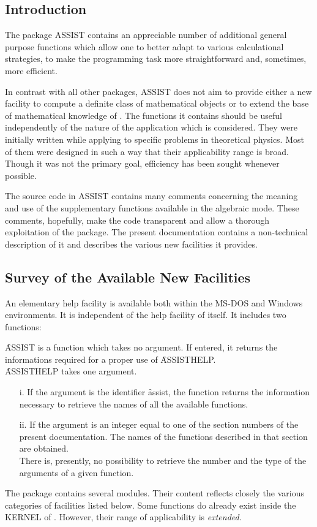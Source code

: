\subsection{Introduction}
The package ASSIST contains
an appreciable number of additional general purpose functions which allow
one to better adapt \REDUCE to various calculational strategies,
to make the programming task more straightforward and, sometimes, 
more efficient.

In contrast with all other packages, ASSIST does not aim to provide either a
new facility to compute a definite class of mathematical objects or to extend
the base of mathematical knowledge of \REDUCE.
The functions it contains should be
useful independently of the nature of the application which is considered.
They were initially written while applying \REDUCE to specific problems in
theoretical physics. Most of them were designed
in such a way that their applicability range is broad. Though it was not
the primary goal, efficiency has been sought whenever possible.

The source code in ASSIST contains many comments concerning
the meaning and use of the supplementary functions available
in the algebraic mode. These comments, hopefully, make the code transparent
and allow a thorough exploitation of the package. The present documentation
contains a non-technical description of it and describes the
various new facilities it provides.

\subsection{Survey of the Available New Facilities}
An elementary help facility is available both within
the MS-DOS and Windows environments. It is independent of the
help facility of \REDUCE itself. It includes two functions:

\f{ASSIST} is a function which takes no argument. If entered, it returns 
the informations required for a proper use  of \f{ASSISTHELP}.\\   
\f{ASSISTHELP} takes one argument.
\begin{itemize}
\item[i.] If the argument is the identifier \f{assist}, the function 
returns the information necessary to retrieve the names of all the available
functions.
\item[ii.] If the argument is an integer equal to one of the section numbers
of the present documentation. The names of the functions described
in that section are obtained.\\
There is, presently, no possibility to retrieve the number and the type of 
the arguments of a given function.
\end{itemize}
The package contains several modules. Their content reflects closely
the various categories of facilities listed below. Some functions do
already exist inside the KERNEL of \REDUCE. However, their range
of applicability is \emph{extended}.

